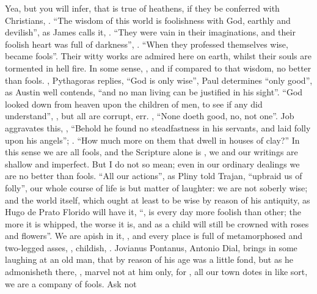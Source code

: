 Yea, but you will infer, that is true of heathens, if they be conferred with
Christians, . \enquote{The wisdom of this world is
foolishness with God, earthly and devilish}, as James calls it, . \enquote{They were vain in their imaginations, and their foolish heart was full of
darkness}, . \enquote{When they professed themselves wise,
became fools}. Their witty works are admired here on earth, whilst their souls
are tormented in hell fire. In some sense, , and if compared
to that wisdom, no better than fools. ,
Pythagoras replies, \enquote{God is only wise},  Paul determines \enquote{only good}, as Austin well contends, \enquote{and no man
living can be justified in his sight}. \enquote{God looked down from heaven upon the
children of men, to see if any did understand}, , but all are corrupt, err. , \enquote{None doeth good,
no, not one}. Job aggravates this, , \enquote{Behold he found no
steadfastness in his servants, and laid folly upon his angels}; .
\enquote{How much more on them that dwell in houses of clay?} In this sense we are all
fools, and the Scripture alone is , we and
our writings are shallow and imperfect. But I do not so mean; even in our
ordinary dealings we are no better than fools. \enquote{All our actions}, as
Pliny told Trajan, \enquote{upbraid us of folly}, our whole course
of life is but matter of laughter: we are not soberly wise; and the world
itself, which ought at least to be wise by reason of his antiquity, as
Hugo de Prato Florido will have it, \enquote{,
is every day more foolish than other; the more it is whipped, the worse it is,
and as a child will still be crowned with roses and flowers}. We are apish in
it, , and every place is full  of
metamorphosed and two-legged asses, , childish,
. Jovianus Pontanus,
Antonio Dial, brings in some laughing at an old man, that by reason of his age
was a little fond, but as he admonisheth there, , marvel not at him only, for , all our
town dotes in like sort, we are a company of fools. Ask not
